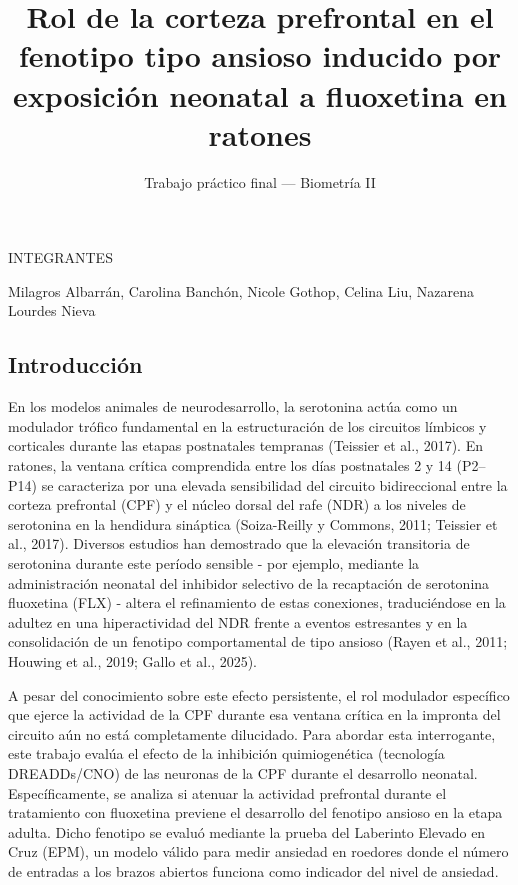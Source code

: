 \documentclass[
  letterpaper,
  DIV=11,
  numbers=noendperiod]{scrartcl}
\title{Rol de la corteza prefrontal en el fenotipo tipo ansioso inducido
por exposición neonatal a fluoxetina en ratones}
\subtitle{Trabajo práctico final --- Biometría II}
\author{}
\date{}
\begin{document}
\maketitle


INTEGRANTES

Milagros Albarrán, Carolina Banchón, Nicole Gothop, Celina Liu, Nazarena
Lourdes Nieva

\subsection{\texorpdfstring{\textbf{Introducción}}{Introducción}}\label{introducciuxf3n}

En los modelos animales de neurodesarrollo, la serotonina actúa como un
modulador trófico fundamental en la estructuración de los circuitos
límbicos y corticales durante las etapas postnatales tempranas (Teissier
et al., 2017). En ratones, la ventana crítica comprendida entre los días
postnatales 2 y 14 (P2--P14) se caracteriza por una elevada sensibilidad
del circuito bidireccional entre la corteza prefrontal (CPF) y el núcleo
dorsal del rafe (NDR) a los niveles de serotonina en la hendidura
sináptica (Soiza-Reilly y Commons, 2011; Teissier et al., 2017).
Diversos estudios han demostrado que la elevación transitoria de
serotonina durante este período sensible - por ejemplo, mediante la
administración neonatal del inhibidor selectivo de la recaptación de
serotonina fluoxetina (FLX) - altera el refinamiento de estas
conexiones, traduciéndose en la adultez en una hiperactividad del NDR
frente a eventos estresantes y en la consolidación de un fenotipo
comportamental de tipo ansioso (Rayen et al., 2011; Houwing et al.,
2019; Gallo et al., 2025).

A pesar del conocimiento sobre este efecto persistente, el rol modulador
específico que ejerce la actividad de la CPF durante esa ventana crítica
en la impronta del circuito aún no está completamente dilucidado. Para
abordar esta interrogante, este trabajo evalúa el efecto de la
inhibición quimiogenética (tecnología DREADDs/CNO) de las neuronas de la
CPF durante el desarrollo neonatal. Específicamente, se analiza si
atenuar la actividad prefrontal durante el tratamiento con fluoxetina
previene el desarrollo del fenotipo ansioso en la etapa adulta. Dicho
fenotipo se evaluó mediante la prueba del Laberinto Elevado en Cruz
(EPM), un modelo válido para medir ansiedad en roedores donde el número
de entradas a los brazos abiertos funciona como indicador del nivel de
ansiedad.
\end{document}

